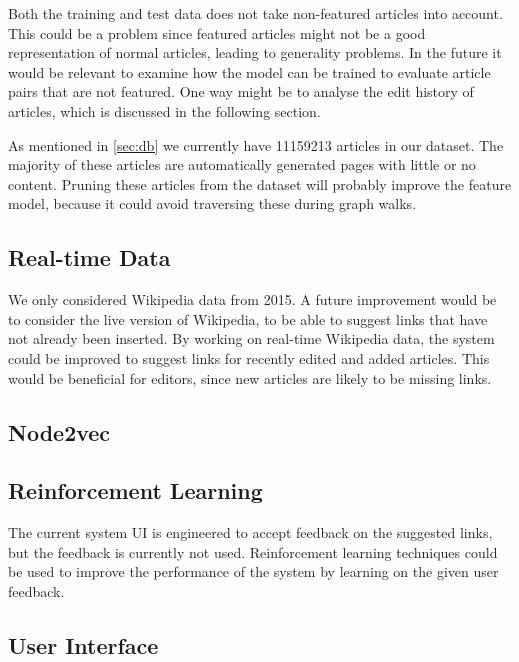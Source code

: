 Both the training and test data does not take non-featured articles into account. This could be a problem since featured articles might not be a good representation of normal articles, leading to generality problems. In the future it would be relevant to examine how the model can be trained to evaluate article pairs that are not featured. One way might be to analyse the edit history of articles, which is discussed in the following section. %

As mentioned in \cref{sec:db} we currently have \num{11159213} articles in our dataset. The majority of these articles are automatically generated pages with little or no content. Pruning these articles from the dataset will probably improve the feature model, because it could avoid traversing these during graph walks.

\subsection{Real-time Data}
We only considered Wikipedia data from 2015. A future improvement would be to consider the live version of Wikipedia, to be able to suggest links that have not already been inserted.
By working on real-time Wikipedia data, the system could be improved to suggest links for recently edited and added articles. This would be beneficial for editors, since new articles are likely to be missing links.

\subsection{Node2vec}

\subsection{Reinforcement Learning}
The current system UI is engineered to accept feedback on the suggested links, but the feedback is currently not used. Reinforcement learning techniques could be used to improve the performance of the system by learning on the given user feedback.

\subsection{User Interface}

